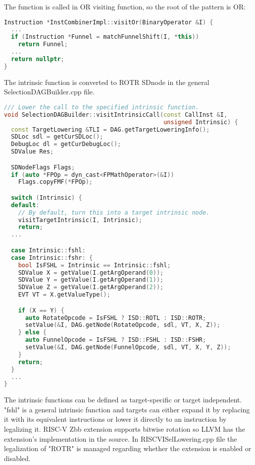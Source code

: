 The function is called in OR visiting function, so the root of the pattern is OR:

\begin{lstlisting}[language=C++, caption={Funnel Shift Right Pattern Function Called}]
Instruction *InstCombinerImpl::visitOr(BinaryOperator &I) {
  ...
  if (Instruction *Funnel = matchFunnelShift(I, *this))
    return Funnel;
  ...
  return nullptr;
}


\end{lstlisting}

The intrinsic function is converted to ROTR SDnode in the general SelectionDAGBuilder.cpp file.
\begin{lstlisting}[language=C++, caption={Funnel Shift Intrinsic converted to ROTL}]
/// Lower the call to the specified intrinsic function.
void SelectionDAGBuilder::visitIntrinsicCall(const CallInst &I,
                                             unsigned Intrinsic) {
  const TargetLowering &TLI = DAG.getTargetLoweringInfo();
  SDLoc sdl = getCurSDLoc();
  DebugLoc dl = getCurDebugLoc();
  SDValue Res;

  SDNodeFlags Flags;
  if (auto *FPOp = dyn_cast<FPMathOperator>(&I))
    Flags.copyFMF(*FPOp);

  switch (Intrinsic) {
  default:
    // By default, turn this into a target intrinsic node.
    visitTargetIntrinsic(I, Intrinsic);
    return;
  ...

  case Intrinsic::fshl:
  case Intrinsic::fshr: {
    bool IsFSHL = Intrinsic == Intrinsic::fshl;
    SDValue X = getValue(I.getArgOperand(0));
    SDValue Y = getValue(I.getArgOperand(1));
    SDValue Z = getValue(I.getArgOperand(2));
    EVT VT = X.getValueType();

    if (X == Y) {
      auto RotateOpcode = IsFSHL ? ISD::ROTL : ISD::ROTR;
      setValue(&I, DAG.getNode(RotateOpcode, sdl, VT, X, Z));
    } else {
      auto FunnelOpcode = IsFSHL ? ISD::FSHL : ISD::FSHR;
      setValue(&I, DAG.getNode(FunnelOpcode, sdl, VT, X, Y, Z));
    }
    return;
  }
  ...
}

\end{lstlisting}


The intrinsic functions can be defined as target-specific or target independent. "fshl" is a general intrinsic function and targets can either expand it by replacing it with its equivalent instructions or lower it directly to an instruction by legalizing it. RISC-V Zbb extension supports bitwise rotation so LLVM has the extension's implementation in the source. In RISCVISelLowering.cpp file the legalization of "ROTR" is managed regarding whether the extension is enabled or disabled.

